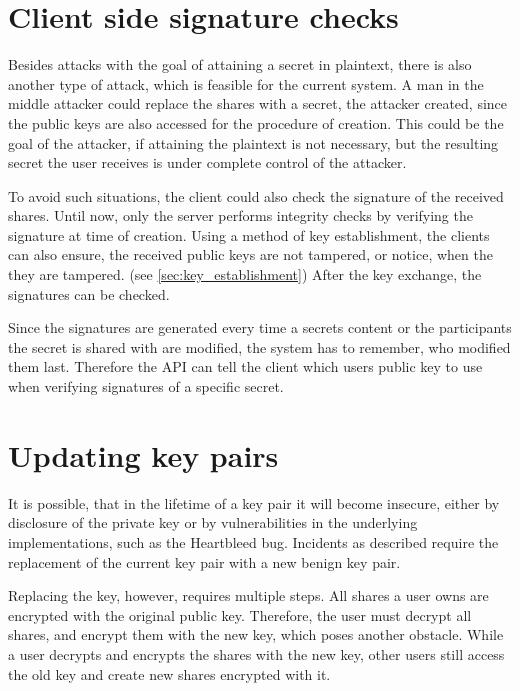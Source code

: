 \section{Client side signature checks}
\label{sec:future:client_sig_check}

Besides attacks with the goal of attaining a secret in plaintext, there is also
another type of attack, which is feasible for the current system. A man in the
middle attacker could replace the shares with a secret, the attacker created,
since the public keys are also accessed for the procedure of creation. This
could be the goal of the attacker, if attaining the plaintext is not necessary,
but the resulting secret the user receives is under complete control of the
attacker.

To avoid such situations, the client could also check the signature of the
received shares. Until now, only the server performs integrity checks by
verifying the signature at time of creation. Using a method of key
establishment, the clients can also ensure, the received public keys are not
tampered, or notice, when the they are tampered. (see
\ref{sec:key_establishment}) After the key exchange, the signatures can be
checked.

Since the signatures are generated every time a secrets content or the
participants the secret is shared with are modified, the system has to
remember, who modified them last. Therefore the API can tell the client which
users public key to use when verifying signatures of a specific secret.

\section{Updating key pairs}
\label{sec:update_key_pair}

It is possible, that in the lifetime of a key pair it will become insecure,
either by disclosure of the private key or by vulnerabilities in the underlying
implementations, such as the Heartbleed bug. Incidents as described require
the replacement of the current key pair with a new benign key pair.

Replacing the key, however, requires multiple steps. All shares a user owns are
encrypted with the original public key. Therefore, the user must decrypt all
shares, and encrypt them with the new key, which poses another obstacle. While
a user decrypts and encrypts the shares with the new key, other users still
access the old key and create new shares encrypted with it.

